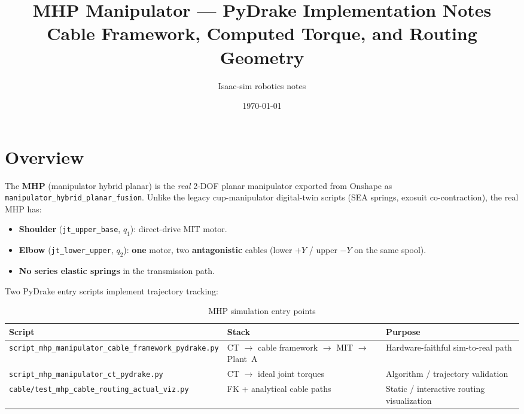 \documentclass[11pt,a4paper]{article}
\title{%
  \textbf{MHP Manipulator --- PyDrake Implementation Notes}\\[0.4em]
  \large Cable Framework, Computed Torque, and Routing Geometry
}
\author{Isaac-sim robotics notes}
\date{\today}
\begin{document}
\maketitle
\tableofcontents
\newpage

\section{Overview}

The \textbf{MHP} (manipulator hybrid planar) is the \emph{real} 2-DOF planar
manipulator exported from Onshape as
\texttt{manipulator\_hybrid\_planar\_fusion}.  Unlike the legacy cup-manipulator
digital-twin scripts (SEA springs, exosuit co-contraction), the real MHP has:

\begin{itemize}[noitemsep]
  \item \textbf{Shoulder} (\texttt{jt\_upper\_base}, $q_1$): direct-drive MIT motor.
  \item \textbf{Elbow} (\texttt{jt\_lower\_upper}, $q_2$): \textbf{one} motor,
        two \textbf{antagonistic} cables (lower $+Y$ / upper $-Y$ on the same spool).
  \item \textbf{No series elastic springs} in the transmission path.
\end{itemize}

Two PyDrake entry scripts implement trajectory tracking:

\begin{table}[H]
\centering
\caption{MHP simulation entry points}
\begin{tabular}{@{}lll@{}}
\toprule
\textbf{Script} & \textbf{Stack} & \textbf{Purpose} \\
\midrule
\texttt{script\_mhp\_manipulator\_cable\_framework\_pydrake.py}
  & CT $\to$ cable framework $\to$ MIT $\to$ Plant~A
  & Hardware-faithful sim-to-real path \\
\texttt{script\_mhp\_manipulator\_ct\_pydrake.py}
  & CT $\to$ ideal joint torques
  & Algorithm / trajectory validation \\
\texttt{cable/test\_mhp\_cable\_routing\_actual\_viz.py}
  & FK + analytical cable paths
  & Static / interactive routing visualization \\
\bottomrule
\end{tabular}
\end{table}
\end{document}
